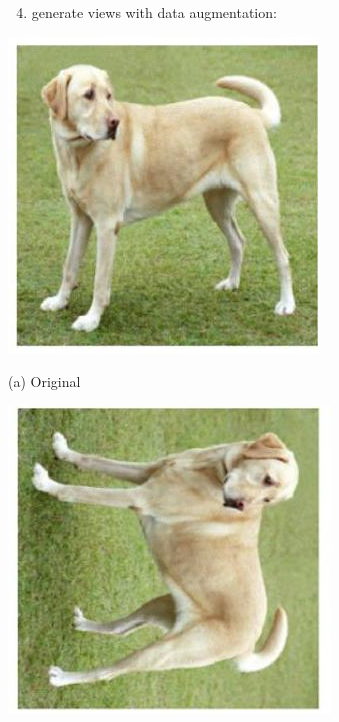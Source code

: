 \documentclass[10pt]{article}
\begin{document}
\begin{enumerate}
  \setcounter{enumi}{3}
  \item generate views with data augmentation:
\end{enumerate}

\begin{center}
\includegraphics[max width=\textwidth]{2024_01_08_7c14f4867d7823fc5a52g-14(7)}
\end{center}

(a) Original

\begin{center}
\includegraphics[max width=\textwidth]{2024_01_08_7c14f4867d7823fc5a52g-14(3)}
\end{center}
\end{document}
